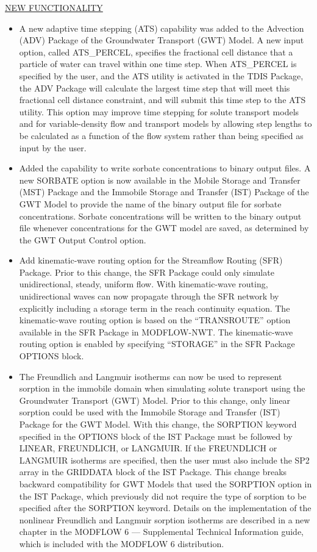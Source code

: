 	
	\item \currentmodflowversion
	
	\underline{NEW FUNCTIONALITY}
	\begin{itemize}
		\item A new adaptive time stepping (ATS) capability was added to the Advection (ADV) Package of the Groundwater Transport (GWT) Model.  A new input option, called ATS\_PERCEL, specifies the fractional cell distance that a particle of water can travel within one time step.  When ATS\_PERCEL is specified by the user, and the ATS utility is activated in the TDIS Package, the ADV Package will calculate the largest time step that will meet this fractional cell distance constraint, and will submit this time step to the ATS utility.  This option may improve time stepping for solute transport models and for variable-density flow and transport models by allowing step lengths to be calculated as a function of the flow system rather than being specified as input by the user.
		\item Added the capability to write sorbate concentrations to binary output files.  A new SORBATE option is now available in the Mobile Storage and Transfer (MST) Package and the Immobile Storage and Transfer (IST) Package of the GWT Model to provide the name of the binary output file for sorbate concentrations. Sorbate concentrations will be written to the binary output file whenever concentrations for the GWT model are saved, as determined by the GWT Output Control option.
		\item Add kinematic-wave routing option for the Streamflow Routing (SFR) Package. Prior to this change, the SFR Package could only simulate unidirectional, steady, uniform flow. With kinematic-wave routing, unidirectional waves can now propagate through the SFR network by explicitly including a storage term in the reach continuity equation. The kinematic-wave routing option is based on the ``TRANSROUTE'' option available in the SFR Package in MODFLOW-NWT. The kinematic-wave routing option is enabled by specifying ``STORAGE'' in the SFR Package OPTIONS block.
		\item The Freundlich and Langmuir isotherms can now be used to represent sorption in the immobile domain when simulating solute transport using the Groundwater Transport (GWT) Model.  Prior to this change, only linear sorption could be used with the Immobile Storage and Transfer (IST) Package for the GWT Model.  With this change, the SORPTION keyword specified in the OPTIONS block of the IST Package must be followed by LINEAR, FREUNDLICH, or LANGMUIR.  If the FREUNDLICH or LANGMUIR isotherms are specified, then the user must also include the SP2 array in the GRIDDATA block of the IST Package.  This change breaks backward compatibility for GWT Models that used the SORPTION option in the IST Package, which previously did not require the type of sorption to be specified after the SORPTION keyword.  Details on the implementation of the nonlinear Freundlich and Langmuir sorption isotherms are described in a new chapter in the MODFLOW 6 --- Supplemental Technical Information guide, which is included with the MODFLOW 6 distribution.

\end{itemize}
